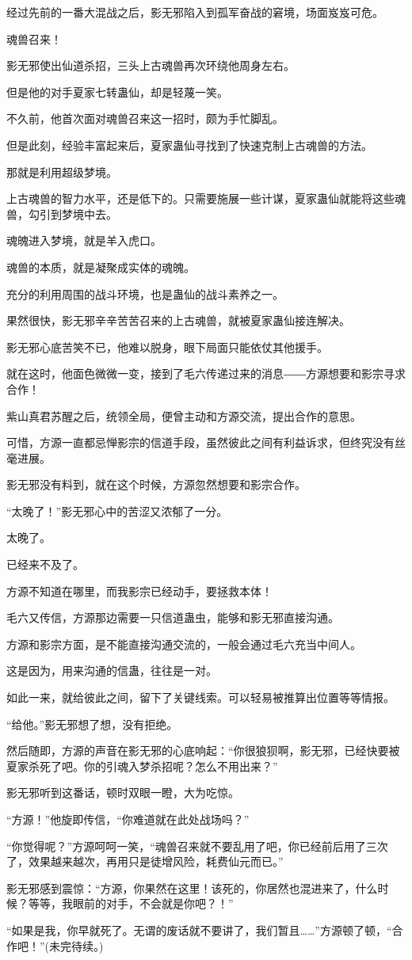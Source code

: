 \begin{this_body}
经过先前的一番大混战之后，影无邪陷入到孤军奋战的窘境，场面岌岌可危。

魂兽召来！

影无邪使出仙道杀招，三头上古魂兽再次环绕他周身左右。

但是他的对手夏家七转蛊仙，却是轻蔑一笑。

不久前，他首次面对魂兽召来这一招时，颇为手忙脚乱。

但是此刻，经验丰富起来后，夏家蛊仙寻找到了快速克制上古魂兽的方法。

那就是利用超级梦境。

上古魂兽的智力水平，还是低下的。只需要施展一些计谋，夏家蛊仙就能将这些魂兽，勾引到梦境中去。

魂魄进入梦境，就是羊入虎口。

魂兽的本质，就是凝聚成实体的魂魄。

充分的利用周围的战斗环境，也是蛊仙的战斗素养之一。

果然很快，影无邪辛辛苦苦召来的上古魂兽，就被夏家蛊仙接连解决。

影无邪心底苦笑不已，他难以脱身，眼下局面只能依仗其他援手。

就在这时，他面色微微一变，接到了毛六传递过来的消息――方源想要和影宗寻求合作！

紫山真君苏醒之后，统领全局，便曾主动和方源交流，提出合作的意思。

可惜，方源一直都忌惮影宗的信道手段，虽然彼此之间有利益诉求，但终究没有丝毫进展。

影无邪没有料到，就在这个时候，方源忽然想要和影宗合作。

“太晚了！”影无邪心中的苦涩又浓郁了一分。

太晚了。

已经来不及了。

方源不知道在哪里，而我影宗已经动手，要拯救本体！

毛六又传信，方源那边需要一只信道蛊虫，能够和影无邪直接沟通。

方源和影宗方面，是不能直接沟通交流的，一般会通过毛六充当中间人。

这是因为，用来沟通的信蛊，往往是一对。

如此一来，就给彼此之间，留下了关键线索。可以轻易被推算出位置等等情报。

“给他。”影无邪想了想，没有拒绝。

然后随即，方源的声音在影无邪的心底响起：“你很狼狈啊，影无邪，已经快要被夏家杀死了吧。你的引魂入梦杀招呢？怎么不用出来？”

影无邪听到这番话，顿时双眼一瞪，大为吃惊。

“方源！”他旋即传信，“你难道就在此处战场吗？”

“你觉得呢？”方源呵呵一笑，“魂兽召来就不要乱用了吧，你已经前后用了三次了，效果越来越次，再用只是徒增风险，耗费仙元而已。”

影无邪感到震惊：“方源，你果然在这里！该死的，你居然也混进来了，什么时候？等等，我眼前的对手，不会就是你吧？！”

“如果是我，你早就死了。无谓的废话就不要讲了，我们暂且……”方源顿了顿，“合作吧！”(未完待续。)

\end{this_body}

